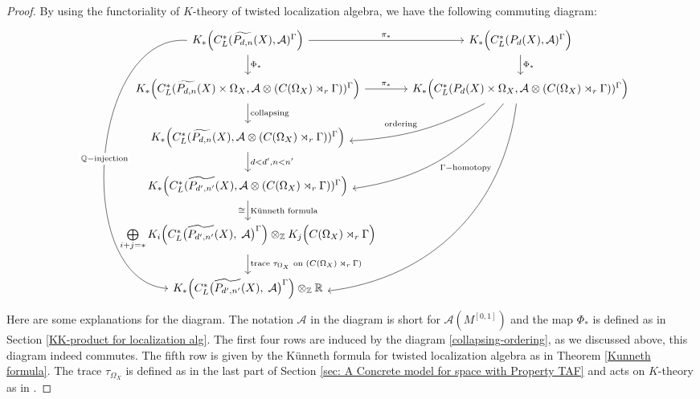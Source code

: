 \documentclass[11pt]{article}
\theoremstyle{definition}
\theoremstyle{plain}
\def\A{\mathcal A}\def\C{\mathcal C}\def\B{\mathcal B}\def\E{\mathcal E}\def\O{\mathcal O}\def\h{\mathfrak h}\def\K{\mathcal K}\def\F{\mathcal F}\def\P{\mathcal P}\def\L{\mathcal L}\def\R{\mathcal R}\def\Q{\mathcal Q}\def\H{\mathcal H}\def\S{\mathcal S}\def\N{\mathcal N}\def\U{\mathcal U}\def\V{\mathcal V}
\def\Ga{\Gamma}
\begin{document}
\begin{proof}
By using the functoriality of $K$-theory of twisted localization algebra, we have the following commuting diagram:
\[\begin{tikzcd}
{K_*\Big(C^*_L(\widetilde{P_{d,n}}(X),\mathcal{A})^{\Gamma}\Big)} \arrow[r, "\pi_*"] \arrow[d, "\Phi_*"]\arrow[ddddd,"\IQ-\text{injection}" description, bend right=90] & {K_*\Big(C^*_L(P_{d}(X),\mathcal{A})^{\Gamma}\Big)} \arrow[d, "\Phi_*"]\\
{K_*\Big(C^*_L(\widetilde{P_{d,n}}(X) \times\Omega_X,\mathcal{A} \otimes (C(\Omega_X)\rtimes_r \Gamma))^{\Gamma}\Big)} \arrow[r, "\pi_*"] \arrow[d, "\text{collapsing}"]&{K_*\Big(C^*_L(P_{d}(X)\times \Omega_X,\mathcal{A}\otimes (C(\Omega_X)\rtimes_r\Gamma))^{\Gamma}\Big)} \arrow[ld, "\text{ordering}"', bend left=12]\arrow[ldd, bend left=21,"\Ga-\text{homotopy}"] \arrow[ldddd, bend left=38] \\
{K_*\Big(C^*_L(\widetilde{P_{d,n}}(X),\mathcal{A}\otimes(C(\Omega_X)\rtimes_r \Gamma))^{\Gamma}\Big)} \arrow[d, "{d<d',n<n'}"]&\\
{K_*\Big(C^*_L(\widetilde{P_{d',n'}}(X),\mathcal{A}\otimes(C(\Omega_X)\rtimes_r \Gamma))^{\Gamma}\Big)} \arrow[d, "\cong"', "\text{K\"unneth formula}"]&\\
{\bigoplus\limits_{i+j=*} K_{i}\Big( C_L^*\big( \widetilde{P_{d',n'}}(X), \; \mathcal{A} \big)^\Gamma \Big) \otimes_{\mathbb{Z}} K_{j} \Big( C(\Omega_X) \rtimes_r \Gamma  \Big)} \arrow[d, "\text{trace $\tau_{\Omega_X}$ on $(C(\Omega_X)\rtimes_r\Gamma)$}"]&\\
{K_{*}\Big( C_L^*\big( \widetilde{P_{d',n'}}(X), \; \A \big)^\Gamma \Big) \otimes_{\mathbb{Z}} \mathbb{R}}&
\end{tikzcd}\]
Here are some explanations for the diagram. The notation $\A$ in the diagram is short for $\A(M^{[0,1]})$ and the map $\Phi_*$ is defined as in Section \ref{KK-product for localization alg}. The first four rows are induced by the diagram \eqref{collapsing-ordering}, as we discussed above, this diagram indeed commutes. The fifth row is given by the K\"unneth formula for twisted localization algebra as in Theorem \ref{Kunneth formula}. The trace $\tau_{\Omega_X}$ is defined as in the last part of Section \ref{sec: A Concrete model for space with Property TAF} and acts on $K$-theory as in \cite[Definition 2.3.17]{HIT2020}.


\end{proof}
\end{document}
